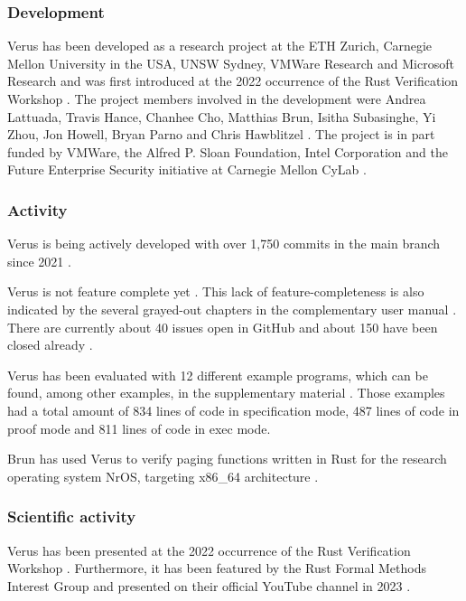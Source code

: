\subsubsection{Development}
Verus has been developed as a research project at the ETH Zurich, Carnegie Mellon University in the USA, UNSW Sydney, VMWare Research and Microsoft Research \cite{lattuadaVerusVerifyingRust2023} and was first introduced at the 2022 occurrence of the Rust Verification Workshop \cite{peter_muller_rust_2022}. The project members involved in the development were Andrea Lattuada, Travis Hance, Chanhee Cho, Matthias Brun, Isitha Subasinghe, Yi Zhou, Jon Howell, Bryan Parno and Chris Hawblitzel \cite{lattuadaVerusVerifyingRust2023}. The project is in part funded by VMWare, the Alfred P. Sloan Foundation, Intel Corporation and the Future Enterprise Security initiative at Carnegie Mellon CyLab \cite{lattuadaVerusVerifyingRust2023}.

\subsubsection{Activity}
Verus is being actively developed with over 1,750 commits in the main branch since 2021 \cite{verus-lang_verus-langverus_2023}. 

Verus is not feature complete yet \cite{verus-lang_verus-langverus_2023}. This lack of feature-completeness is also indicated by the several grayed-out chapters in the complementary user manual \cite{verus-lang_getting_2023}. There are currently about 40 issues open in GitHub and about 150 have been closed already \cite{verus-lang_issues_2023}.

Verus has been evaluated with 12 different example programs, which can be found, among other examples, in the supplementary material \cite{lattuada_verus_2023}. Those examples had a total amount of 834 lines of code in specification mode, 487 lines of code in proof mode and 811 lines of code in exec mode.

Brun has used Verus to verify paging functions written in Rust for the research operating system NrOS, targeting x86\_64 architecture \cite{brun_verified_2022}.

\subsubsection{Scientific activity}
Verus has been presented at the 2022 occurrence of the Rust Verification Workshop \cite{peter_muller_rust_2022}. Furthermore, it has been featured by the Rust Formal Methods Interest Group \cite{rust_formal_methods_interest_group_tools_2021} and presented on their official YouTube channel in 2023 \cite{rust_formal_methods_ig_verus_2023}.

